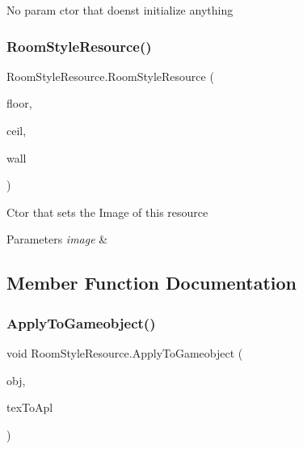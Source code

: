 No param ctor that doens\textquotesingle{}t initialize anything 

\mbox{\label{class_room_style_resource_aa269ae01fc600ab23b7f7ce6a742a3f5}} 
\subsubsection{\texorpdfstring{Room\+Style\+Resource()}{RoomStyleResource()}\hspace{0.1cm}{\footnotesize\ttfamily [2/2]}}
{\footnotesize\ttfamily Room\+Style\+Resource.\+Room\+Style\+Resource (\begin{DoxyParamCaption}\item[{Texture2D}]{floor,  }\item[{Texture2D}]{ceil,  }\item[{Texture2D}]{wall }\end{DoxyParamCaption})}



Ctor that sets the Image of this resource 


\begin{DoxyParams}{Parameters}
{\em image} & \\
\hline
\end{DoxyParams}


\subsection{Member Function Documentation}
\mbox{\label{class_room_style_resource_a631919fd4d90b01b2bfad87a30a6b7b2}} 
\subsubsection{\texorpdfstring{Apply\+To\+Gameobject()}{ApplyToGameobject()}}
{\footnotesize\ttfamily void Room\+Style\+Resource.\+Apply\+To\+Gameobject (\begin{DoxyParamCaption}\item[{Game\+Object}]{obj,  }\item[{\mbox{\hyperlink{class_room_style_resource_a877062d3830671f8376cc30340cdb45f}{Texture\+To\+Apply}}}]{tex\+To\+Apl }\end{DoxyParamCaption})}



